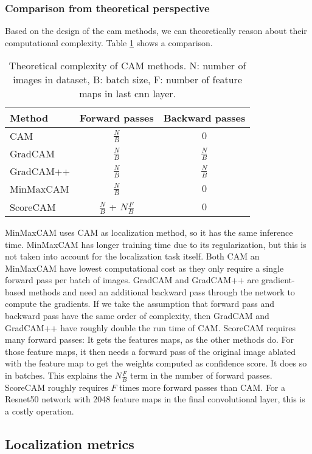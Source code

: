 \subsubsection{Comparison from theoretical perspective}
Based on the design of the \acrshort{cam} methods, we can theoretically reason about their computational complexity. Table \ref{tab:complexity_theoretical} shows a comparison.
\begin{table}[ht]
\centering
\begin{tabular}{|l|c|c|}
  \hline
  Method & Forward passes & Backward passes\\
  \hline
  CAM & $\frac{N}{B}$ & $0$\\
  GradCAM & $\frac{N}{B}$ & $\frac{N}{B}$\\
  GradCAM++ & $\frac{N}{B}$ & $\frac{N}{B}$\\
  MinMaxCAM & $\frac{N}{B}$ & $0$\\
  ScoreCAM & $\frac{N}{B}$ + $N\frac{F}{B}$ & $0$\\
  \hline 
\end{tabular}
\caption[Theoretical complexity of CAM methods]{Theoretical complexity of CAM methods. N: number of images in dataset, B: batch size, F: number of feature maps in last \acrshort{cnn} layer.}
\label{tab:complexity_theoretical}
\end{table}

MinMaxCAM uses CAM as localization method, so it has the same inference time. MinMaxCAM has longer training time due to its regularization, but this is not taken into account for the localization task itself. Both CAM an MinMaxCAM have lowest computational cost as they only require a single forward pass per batch of images. GradCAM and GradCAM++ are gradient-based methods and need an additional backward pass through the network to compute the gradients. If we take the assumption that forward pass and backward pass have the same order of complexity, then GradCAM and GradCAM++ have roughly double the run time of CAM. ScoreCAM requires many forward passes: It gets the features maps, as the other methods do. For those feature maps, it then needs a forward pass of the original image ablated with the feature map to get the weights computed as confidence score. It does so in batches. This explains the $N\frac{F}{B}$ term in the number of forward passes. ScoreCAM roughly requires $F$ times more forward passes than CAM. For a Resnet50 network with 2048 feature maps in the final convolutional layer, this is a costly operation.

\subsection{Localization metrics} \label{sec:localization_metrics}

